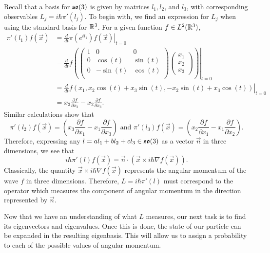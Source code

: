 \documentclass[a4paper]{article}
\begin{document}
Recall that a basis for $\mathfrak{so}(3)$ is given by matrices $l_1, l_2$, and $l_3$, with corresponding observables $L_j = i\hbar\pi'(l_j)$.  To begin with, we find an expression for $L_j$ when using the standard basis for $\mathbb{R}^3$. For a given function $f \in L^2(\mathbb{R}^3)$,
\begin{align*}
    \pi'(l_1)f(\vec{x}) &= \left. \frac{d}{dt} \pi\left(e^{t l_1}\right)f(\vec{x}) \right|_{t=0}\\ 
    &= \left. \frac{d}{dt} f\left(\begin{pmatrix} 1 & 0 & 0 \\ 0 & \cos(t) & \sin(t) \\ 0 & -\sin(t) & \cos(t) \\ \end{pmatrix} \begin{pmatrix}x_1 \\ x_2 \\ x_3 \end{pmatrix}\right) \right|_{t=0}\\
    &= \left. \frac{d}{dt} f(x_1, x_2\cos(t) + x_3 \sin(t), -x_2\sin(t) + x_3 \cos(t)) \right|_{t=0}\\ 
    &= x_3\frac{\partial f}{\partial x_2} - x_2\frac{\partial f}{\partial x_3}.
\end{align*}
Similar calculations show that 
$$\pi'(l_2)f(\vec{x}) = \left(x_3\frac{\partial f}{\partial x_1} - x_1\frac{\partial f}{\partial x_3}\right) \text{  and  } \pi'(l_3)f(\vec{x}) = \left(x_2\frac{\partial f}{\partial x_1} - x_1\frac{\partial f}{\partial x_2}\right).$$
Therefore, expressing any $l = al_1 + bl_2 + cl_3 \in \mathfrak{so}(3)$ as a vector $\vec{n}$ in three dimensions, we see that 
$$i\hbar\pi'(l)f(\vec{x}) = \vec{n} \cdot (\vec{x} \times i\hbar \nabla f(\vec{x})).$$
Classically, the quantity $
\vec{x} \times i\hbar \nabla f(\vec{x})$ represents the angular momentum of the wave $f$ in three dimensions. Therefore, $L = i\hbar\pi'(l)$ must correspond to the operator which measures the component of angular momentum in the direction represented by $\vec{n}$.

Now that we have an understanding of what $L$ measures, our next task is to find its eigenvectors and eigenvalues. Once this is done, the state of our particle can be expanded in the resulting eigenbasis. This will allow us to assign a probability to each of the possible values of angular momentum. 
\end{document}

